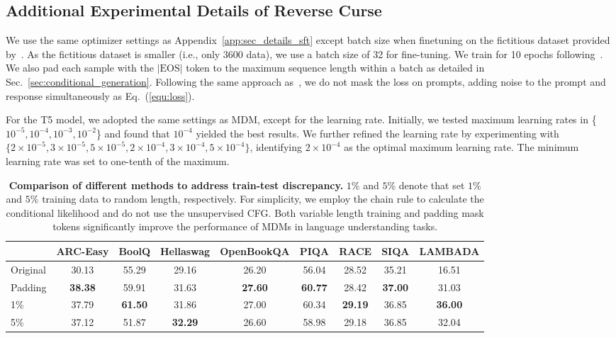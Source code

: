 \documentclass{article} %
\begin{document}
\subsection{Additional Experimental Details of Reverse Curse}
\label{app:sec_details_reverse}
We use the same optimizer settings as Appendix~\ref{app:sec_details_sft} except batch size when finetuning on the fictitious dataset provided by~\cite{berglund2023reversal}. As the fictitious dataset is smaller (i.e., only 3600 data), we use a batch size of 32 for fine-tuning. We train for 10 epochs following~\cite{berglund2023reversal}. We also pad each sample with the $|\text{EOS}|$ token to the maximum sequence length within a batch as detailed in Sec.~\ref{sec:conditional_generation}. Following the same approach as~\cite{berglund2023reversal}, we do not mask the loss on prompts, adding noise to the prompt and response simultaneously as Eq.~(\ref{equ:loss}).

For the T5 model, we adopted the same settings as MDM, except for the learning rate. Initially, we tested maximum learning rates in \{$10^{-5}, 10^{-4}, 10^{-3}, 10^{-2}$\} and found that $10^{-4}$ yielded the best results. We further refined the learning rate by experimenting with $\{2\times10^{-5}, 3\times10^{-5}, 5\times10^{-5}, 2\times10^{-4}, 3\times10^{-4}, 5\times10^{-4}\}$, identifying $2\times10^{-4}$ as the optimal maximum learning rate. The minimum learning rate was set to one-tenth of the maximum.

\begin{table}[t!]
    \centering
    \caption{\textbf{Comparison of different methods to address train-test discrepancy.} $1\%$ and $5 \%$ denote that set $1\%$ and $5 \%$ training data to random length, respectively. For simplicity, we employ the chain rule to calculate the conditional likelihood and do not use the unsupervised CFG. Both variable length training and padding mask tokens significantly improve the performance of MDMs in language understanding tasks. }
    \label{tab:app_train_test_mismatch}
    \begin{adjustbox}{max width=\textwidth}
    \begin{tabular}{lcccccccc}
      \toprule
         & ARC-Easy & BoolQ & Hellaswag &  OpenBookQA &  PIQA & RACE & SIQA & LAMBADA \\
        \midrule
        Original & 30.13 & 55.29 & 29.16 & 26.20 & 56.04 & 28.52 & 35.21 & 16.51 \\
        \midrule
        Padding & \textbf{38.38} & 59.91 &31.63 & \textbf{27.60} & \textbf{60.77} & 28.42 & \textbf{37.00} & 31.03 \\
        \midrule
        1\% & 37.79 & \textbf{61.50} & 31.86 & 27.00 & 60.34 & \textbf{29.19} & 36.85 & \textbf{36.00}\\
        \midrule
        5\%  & 37.12 & 51.87 & \textbf{32.29} & 26.60 & 58.98 & 29.18 & 36.85 & 32.04\\
      \bottomrule
    \end{tabular}
    \end{adjustbox}
\end{table}
\end{document}
